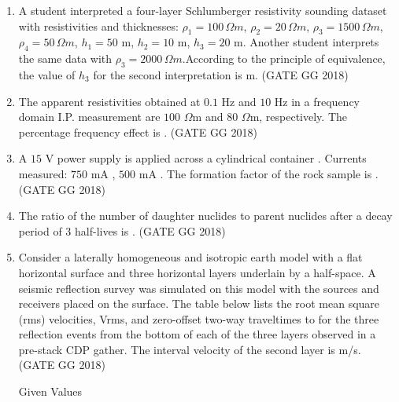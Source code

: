 \documentclass[journal]{IEEEtran}
\begin{document}
\begin{enumerate}[start=1]
\item A student interpreted a four-layer Schlumberger resistivity sounding dataset with resistivities and thicknesses:  
$\rho_1=100\,\Omega m$, $\rho_2=20\,\Omega m$, $\rho_3=1500\,\Omega m$, $\rho_4=50\,\Omega m$, $h_1=50$ m, $h_2=10$ m, $h_3=20$ m. Another student interprets the same data with $\rho_3=2000\,\Omega m$.According to the principle of equivalence, the value of $h_3$ for the second interpretation is \makebox[2cm]{\hrulefill} m.
\hspace*{15.7cm}(GATE GG 2018)
\vspace{0.5cm}

\item The apparent resistivities obtained at $0.1$ Hz and $10$ Hz in a frequency domain I.P. measurement are  $100$ $\Omega$m and $80$ $\Omega$m, respectively.  
The percentage frequency effect is \makebox[2cm]{\hrulefill}.
\hfill(GATE GG 2018)
\vspace{0.5cm}

\item A $15$ V power supply is applied across a cylindrical container . Currents measured: $750$ mA , $500$ mA .  The formation factor of the rock sample is \makebox[2cm]{\hrulefill}.
\hspace*{15.7cm}(GATE GG 2018)
\vspace{0.5cm}

\item The ratio of the number of daughter nuclides to parent nuclides after a decay period of $3$ half-lives is \makebox[2cm]{\hrulefill}.
\hspace*{15.7cm}(GATE GG 2018)
\vspace{0.5cm}

\item Consider a laterally homogeneous and isotropic earth model with a flat horizontal surface and three horizontal layers underlain by a half-space. A seismic reflection survey was simulated on this model with the sources and receivers placed on the surface. The table below lists the root mean square (rms) velocities, Vrms, and zero-offset two-way traveltimes to for the three reflection events from the bottom of each of the three layers observed in a pre-stack CDP  gather. The interval velocity of the second layer is\makebox[2cm]{\hrulefill} m/s.
\hfill(GATE GG 2018)
\begin{table}[h]
    \centering
    
    \caption{Given Values}
    \label{tab:1}
\end{table}


\end{enumerate}
\end{document}
